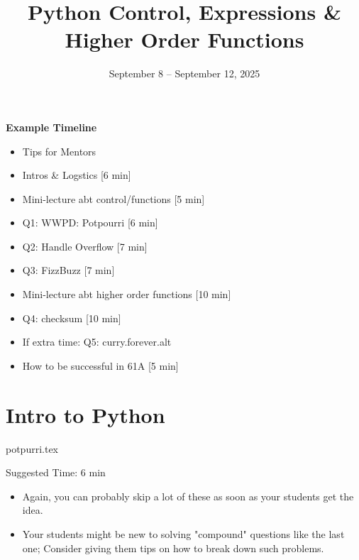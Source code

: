 \documentclass{exam}
\title{Python Control, Expressions \& Higher Order Functions}
\date{September 8 -- September 12, 2025}
\begin{document}
\maketitle

\begin{meta}
    \textbf{Example Timeline}
    \begin{itemize}
        \item Tips for Mentors

        \item Intros \& Logstics [6 min]
        \item Mini-lecture abt control/functions [5 min]  
        \item Q1: WWPD: Potpourri [6 min]
        \item Q2: Handle Overflow [7 min]
        \item Q3: FizzBuzz [7 min]
        \item Mini-lecture abt higher order functions [10 min] 
        \item Q4: checksum [10 min]
        \item If extra time: Q5: curry.forever.alt
        \item How to be successful in 61A [5 min]
    \end{itemize}
\end{meta}

\section{Intro to Python}
\begin{questions}
    {potpurri.tex}
    \begin{questionmeta}
        Suggested Time: 6 min
        \begin{itemize}
            \item Again, you can probably skip a lot of these as soon as your students get the idea.
            \item Your students might be new to solving "compound" questions like the last one; Consider giving them tips on how to break down such problems.
        \end{itemize}
    \end{questionmeta}
\end{questions}
\end{document}
